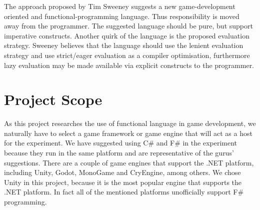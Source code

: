 
The approach proposed by Tim Sweeney suggests a new game-development oriented and functional-programming language\cite{theNextMainstreanProgrammingLanguage}. Thus responsibility is moved away from the programmer. The suggested language should be pure, but support imperative constructs. Another quirk of the language is the proposed evaluation strategy. Sweeney believes that the language should use the lenient evaluation strategy and use strict/eager evaluation as a compiler optimisation, furthermore lazy evaluation may be made available via explicit constructs to the programmer.



\section{Project Scope}
As this project researches the use of functional language in game development, we naturally have to select a game framework or game engine that will act as a host for the experiment. We have suggested using C\# and F\# in the experiment because they run in the same platform and are representative of the gurus' suggestions. There are a couple of game engines that support the .NET platform, including Unity, Godot, MonoGame and CryEngine, among others\cite{p92018gameplay}. We chose Unity in this project, because it is the most popular engine that supports the .NET platform\cite{game:engine:popularity}. In fact all of the mentioned platforms unofficially support F\# programming\cite{godot:fsharp,monogame:fsharp,cryengine:fsharp}.
